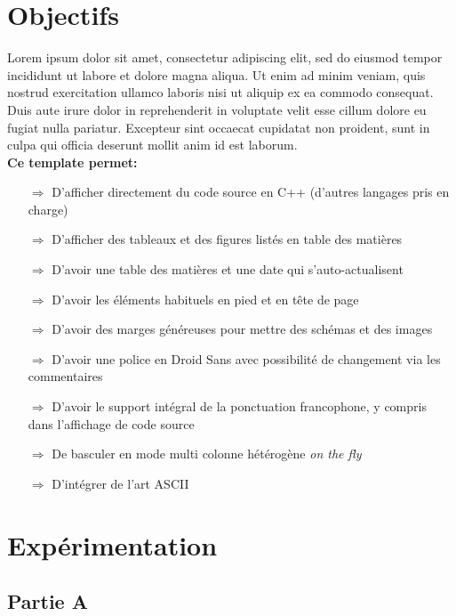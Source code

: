 \renewcommand\headrulewidth{1pt}

\renewcommand\footrulewidth{1pt}
\fancyfoot[R]{\today}

\section{Objectifs}
Lorem ipsum dolor sit amet, consectetur adipiscing elit, sed do eiusmod tempor incididunt ut labore et dolore magna aliqua. Ut enim ad minim veniam, quis nostrud exercitation ullamco laboris nisi ut aliquip ex ea commodo consequat. Duis aute irure dolor in reprehenderit in voluptate velit esse cillum dolore eu fugiat nulla pariatur. Excepteur sint occaecat cupidatat non proident, sunt in culpa qui officia deserunt mollit anim id est laborum.\\

\textbf{Ce template permet:}
\begin{itemize}
\item[$\Rightarrow$]D'afficher directement du code source en C++ (d'autres langages pris en charge)
\item[$\Rightarrow$]D'afficher des tableaux et des figures listés en table des matières
\item[$\Rightarrow$]D'avoir une table des matières et une date qui s'auto-actualisent
\item[$\Rightarrow$]D'avoir les éléments habituels en pied et en tête de page
\item[$\Rightarrow$]D'avoir des marges généreuses pour mettre des schémas et des images
\item[$\Rightarrow$]D'avoir une police en Droid Sans avec possibilité de changement via les commentaires
\item[$\Rightarrow$]D'avoir le support intégral de la ponctuation francophone, y compris dans l'affichage de code source
\item[$\Rightarrow$]De basculer en mode multi colonne hétérogène \textit{on the fly}
\item[$\Rightarrow$]D'intégrer de l'art ASCII
\end{itemize}

\section{Expérimentation}
\subsection{Partie A}
